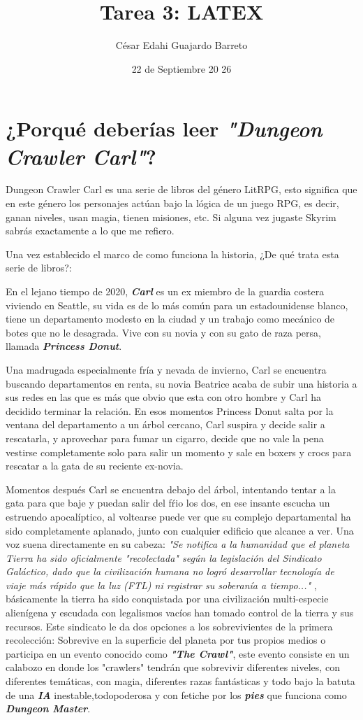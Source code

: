 \documentclass{article}
\title{Tarea 3: LATEX}
\author{César Edahi Guajardo Barreto}
\date{ 22 de Septiembre 20
26}
\begin{document}
\maketitle

\section{¿Porqué deberías leer \textbf{\textit{"Dungeon Crawler Carl"}}?}
Dungeon Crawler Carl es una serie de libros del género LitRPG, esto significa que en este género los personajes actúan bajo la lógica de un juego RPG, es decir, ganan niveles, usan magia, tienen misiones, etc. Si alguna vez jugaste Skyrim sabrás exactamente a lo que me refiero.

Una vez establecido el marco de como funciona la historia, ¿De qué trata esta serie de libros?:

En el lejano tiempo de 2020, \textbf{\textit{Carl}} es un ex miembro de la guardia costera viviendo en Seattle, su vida es de lo más común para un estadounidense blanco, tiene un departamento modesto en la ciudad y un trabajo como mecánico de botes que no le desagrada. Vive con su novia y con su gato de raza persa, llamada \textbf{\textit{Princess Donut}}.

Una madrugada especialmente fría y nevada de invierno,  Carl se encuentra buscando departamentos en renta, su novia Beatrice acaba de subir una historia a sus redes en las que es más que obvio que esta con otro hombre y Carl ha decidido terminar la relación. En esos momentos Princess Donut salta por la ventana del departamento a un árbol cercano, Carl suspira y decide salir a rescatarla, y aprovechar para fumar un cigarro, decide que no vale la pena vestirse completamente solo para salir un momento y sale en boxers y crocs para rescatar a la gata de su reciente ex-novia.

Momentos después Carl se encuentra debajo del árbol, intentando tentar a la gata para que baje y puedan salir del fŕio los dos, en ese insante escucha un estruendo apocalíptico, al voltearse puede ver que su complejo departamental ha sido completamente aplanado, junto con cualquier edificio que alcance a ver. Una voz suena directamente en su cabeza: \textit{"Se notifica a la humanidad que el planeta Tierra ha sido oficialmente "recolectada" según la legislación del Sindicato Galáctico, dado que la civilización humana no logró desarrollar tecnología de viaje más rápido que la luz (FTL) ni registrar su soberanía a tiempo..."} , básicamente la tierra ha sido conquistada por una civilización multi-especie alienígena y escudada con legalismos vacíos han tomado control de la tierra y sus recursos. Este sindicato le da dos opciones a los sobrevivientes de la primera recolección: Sobrevive en la superficie del planeta por tus propios medios o participa en un evento conocido como \textbf{\textit{"The Crawl"}}, este evento consiste en un calabozo en donde los "crawlers" tendrán que sobrevivir diferentes niveles, con diferentes temáticas, con magia, diferentes razas fantásticas y todo bajo la batuta de una \textbf{\textit{IA}} inestable,todopoderosa y con fetiche por los \textbf{\textit{pies}} que funciona como \textbf{\textit{Dungeon Master}}.
\end{document}
